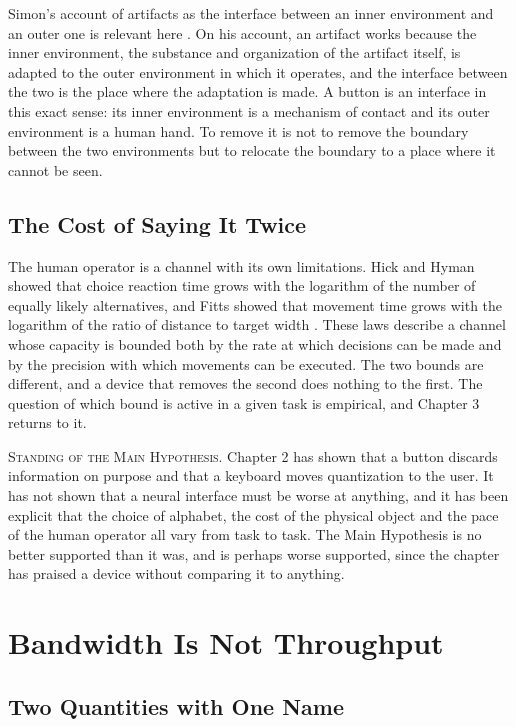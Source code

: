 \documentclass[11pt,twoside,openany]{book}
\theoremstyle{definition}
\theoremstyle{remark}
\newenvironment{standing}{\par\medskip\noindent\hrulefill\par\smallskip\noindent\textsc{Standing of the Main Hypothesis.}\enspace}{\par\smallskip\noindent\hrulefill\par\medskip}
\begin{document}
Simon's account of artifacts as the interface between an inner environment and an outer one is relevant here \cite{simon1996}. On his account, an artifact works because the inner environment, the substance and organization of the artifact itself, is adapted to the outer environment in which it operates, and the interface between the two is the place where the adaptation is made. A button is an interface in this exact sense: its inner environment is a mechanism of contact and its outer environment is a human hand. To remove it is not to remove the boundary between the two environments but to relocate the boundary to a place where it cannot be seen.

\section{The Cost of Saying It Twice}

The human operator is a channel with its own limitations. Hick and Hyman showed that choice reaction time grows with the logarithm of the number of equally likely alternatives, and Fitts showed that movement time grows with the logarithm of the ratio of distance to target width \cite{hick1952,fitts1954,mackenzie1992}. These laws describe a channel whose capacity is bounded both by the rate at which decisions can be made and by the precision with which movements can be executed. The two bounds are different, and a device that removes the second does nothing to the first. The question of which bound is active in a given task is empirical, and Chapter 3 returns to it.

\begin{standing}
Chapter 2 has shown that a button discards information on purpose and that a keyboard moves quantization to the user. It has not shown that a neural interface must be worse at anything, and it has been explicit that the choice of alphabet, the cost of the physical object and the pace of the human operator all vary from task to task. The Main Hypothesis is no better supported than it was, and is perhaps worse supported, since the chapter has praised a device without comparing it to anything.
\end{standing}

\chapter{Bandwidth Is Not Throughput}

\section{Two Quantities with One Name}
\end{document}
